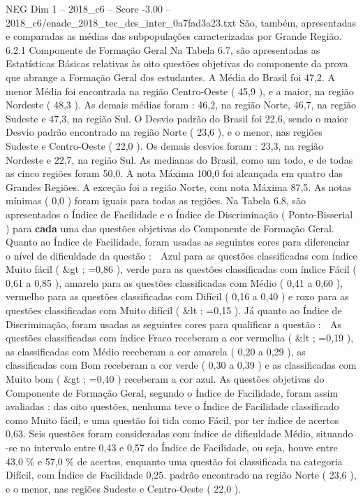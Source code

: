 \begin{textsample}{NEG Dim 1 – 2018\_c6 – Score -3.00 – 2018\_c6/enade\_2018\_tec\_des\_inter\_0a7fad3a23.txt}
São, também, apresentadas e comparadas as médias das subpopulações caracterizadas por Grande Região. 6.2.1 Componente de Formação Geral Na Tabela 6.7, são apresentadas as Estatísticas Básicas relativas às oito questões objetivas do componente da prova que abrange a Formação Geral dos estudantes.
A Média do Brasil foi 47,2.
A menor Média foi encontrada na região Centro-Oeste ( 45,9 ), e a maior, na região Nordeste ( 48,3 ).
As demais médias foram : 46,2, na região Norte, 46,7, na região Sudeste e 47,3, na região Sul.
O Desvio padrão do Brasil foi 22,6, sendo o maior Desvio padrão encontrado na região Norte ( 23,6 ), e o menor, nas regiões Sudeste e Centro-Oeste ( 22,0 ).
Os demais desvios foram : 23,3, na região Nordeste e 22,7, na região Sul.
As medianas do Brasil, como um todo, e de todas as cinco regiões foram 50,0.
A nota Máxima 100,0 foi alcançada em quatro das Grandes Regiões.
A exceção foi a região Norte, com nota Máxima 87,5.
As notas mínimas ( 0,0 ) foram iguais para todas as regiões.
Na Tabela 6.8, são apresentados o Índice de Facilidade e o Índice de Discriminação ( Ponto-Bisserial ) para \textbf{cada} uma das questões objetivas do Componente de Formação Geral.
Quanto ao Índice de Facilidade, foram usadas as seguintes cores para diferenciar o nível de dificuldade da questão :  Azul para as questões classificadas com índice Muito fácil ( \&gt ; =0,86 ), verde para as questões classificadas com índice Fácil ( 0,61 a 0,85 ), amarelo para as questões classificadas com Médio ( 0,41 a 0,60 ), vermelho para as questões classificadas com Difícil ( 0,16 a 0,40 ) e roxo para as questões classificadas com Muito difícil ( \&lt ; =0,15 ).
Já quanto ao Índice de Discriminação, foram usadas as seguintes cores para qualificar a questão :  As questões classificadas com índice Fraco receberam a cor vermelha ( \&lt ; =0,19 ), as classificadas com Médio receberam a cor amarela ( 0,20 a 0,29 ), as classificadas com Bom receberam a cor verde ( 0,30 a 0,39 ) e as classificadas com Muito bom ( \&gt ; =0,40 ) receberam a cor azul.
As questões objetivas do Componente de Formação Geral, segundo o Índice de Facilidade, foram assim avaliadas : das oito questões, nenhuma teve o Índice de Facilidade classificado como Muito fácil, e uma questão foi tida como Fácil, por ter índice de acertos 0,63.
Seis questões foram consideradas com índice de dificuldade Médio, situando -se no intervalo entre 0,43 e 0,57 do Índice de Facilidade, ou seja, houve entre 43,0 \% e 57,0 \% de acertos, enquanto uma questão foi classificada na categoria Difícil, com Índice de Facilidade 0,25. padrão encontrado na região Norte ( 23,6 ), e o menor, nas regiões Sudeste e Centro-Oeste ( 22,0 ).

\end{textsample}
